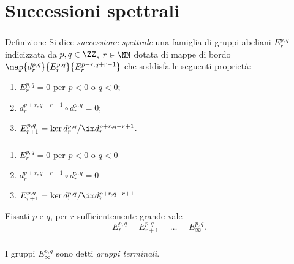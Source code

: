 \section{Successioni spettrali}
\newcommand*{\sseqOne}{\(E^{p,q}_r=0\) per \(p<0\) o \(q<0\)}
\newcommand*{\sseqTwo}{\(d^{p+r,q-r+1}_r\circ d^{p,q}_r=0\)}
\newcommand*{\sseqThree}{\(E^{p,q}_{r+1}=\ker d^{p,q}_r/\im d^{p+r,q-r+1}_r\)}
\begin{frame}
\frametitle{\secname}
\begin{block}{Definizione}
Si dice \emph{successione spettrale} una famiglia di gruppi abeliani \(E^{p,q}_r\) indicizzata da \(p,q\in\ZZ\), \(r\in\NN\) dotata di mappe di bordo \(\map{d^{p,q}_r}{E^{p,q}_r}{E^{p-r,q+r-1}_r}\) che soddisfa le seguenti proprietà:
\begin{enumerate}
\item \sseqOne;
\item \(d^{p+r,q-r+1}_r\circ d^{p,q}_r=0\);
\item \(E^{p,q}_{r+1}=\ker d^{p,q}_r/\im d^{p+r,q-r+1}_r\).
\end{enumerate}
\end{block}
\end{frame}
\begin{frame}
\frametitle{\secname}
\begin{overprint}
\begin{enumerate}
\item \sseqOne\vphantom{\sseqTwo}
\end{enumerate}
\begin{enumerate}
\setcounter{enumi}{1}
\item \sseqTwo
\end{enumerate}
\begin{enumerate}
\setcounter{enumi}{2}
\item \sseqThree
\end{enumerate}
Fissati \(p\) e \(q\), per \(r\) sufficientemente grande vale
\vspace{-10pt}
\[
E^{p,q}_r=E^{p,q}_{r+1}=\ldots=E^{p,q}_\infty.
\]
\end{overprint}
\vfill
\begin{overprint}
\centering{}
\centering{}
\centering{}
\centering{}
\end{overprint}
\end{frame}
\begin{frame}
\frametitle{\secname}
I gruppi $E^{p,q}_\infty$ sono detti \emph{gruppi terminali}.
\vspace{0.5cm}
\end{frame}
